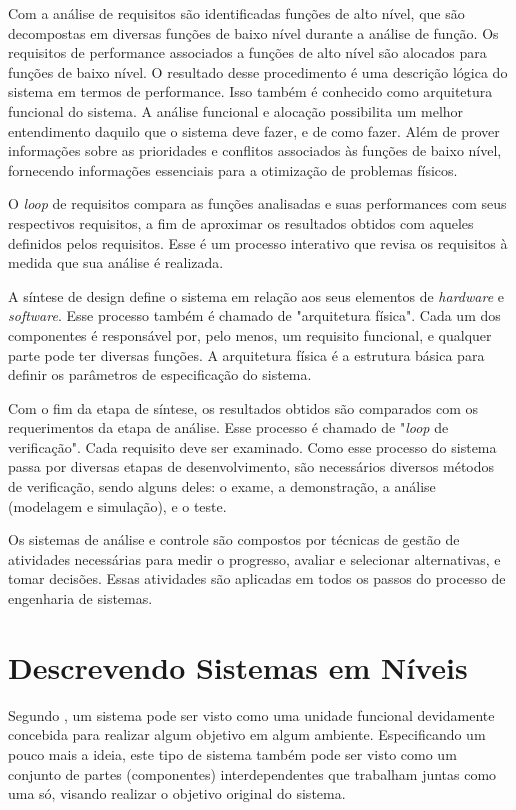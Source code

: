     Com a análise de requisitos são identificadas funções de alto nível, que são decompostas em diversas funções de baixo nível durante a análise de função. Os requisitos de performance associados a funções de alto nível são alocados para funções de baixo nível. O resultado desse procedimento é uma descrição lógica do sistema em termos de performance. Isso também é conhecido como arquitetura funcional do sistema. A análise funcional e alocação possibilita um melhor entendimento daquilo que o sistema deve fazer, e de como fazer. Além de prover informações sobre as prioridades e conflitos associados às funções de baixo nível, fornecendo informações essenciais para a otimização de problemas físicos.
    
    O \textit{loop} de requisitos compara as funções analisadas e suas performances com seus respectivos requisitos, a fim de aproximar os resultados obtidos com aqueles definidos pelos requisitos. Esse é um processo interativo que revisa os requisitos à medida que sua análise é realizada. 
    
    A síntese de design define o sistema em relação aos seus elementos de \textit{hardware} e \textit{software}. Esse processo também é chamado de "arquitetura física". Cada um dos componentes é responsável por, pelo menos, um requisito funcional, e qualquer parte pode ter diversas funções. A arquitetura física é a estrutura básica para definir os parâmetros de especificação do sistema.

    Com o fim da etapa de síntese, os resultados obtidos são comparados com os requerimentos da etapa de análise. Esse processo é chamado de "\textit{loop} de verificação". Cada requisito deve ser examinado. Como esse processo do sistema passa por diversas etapas de desenvolvimento, são necessários diversos métodos de verificação, sendo alguns deles: o exame, a demonstração, a análise (modelagem e simulação), e o teste.
    
    Os sistemas de análise e controle são compostos por técnicas de gestão de atividades necessárias para medir o progresso, avaliar e selecionar alternativas, e tomar decisões. Essas atividades são aplicadas em todos os passos do processo de engenharia de sistemas.

\section{Descrevendo Sistemas em Níveis}
\label{sec:abord-def-nivel}

    Segundo \cite{wilensky1999thinking}, um sistema pode ser visto como uma unidade funcional devidamente concebida para realizar algum objetivo em algum ambiente. Especificando um pouco mais a ideia, este tipo de sistema também pode ser visto como um conjunto de partes (componentes) interdependentes que trabalham juntas como uma só, visando realizar o objetivo original do sistema.%
    
